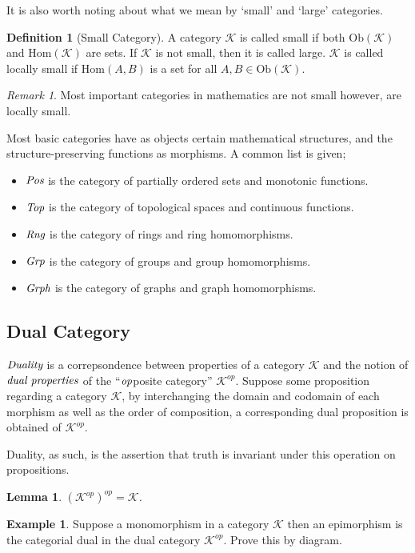 \documentclass[10pt, oneside, reqno]{amsart}
\theoremstyle{plain}%
\newtheorem{lem}[thm]{Lemma}
\theoremstyle{definition}
\newtheorem{defn}[thm]{Definition}
\newtheorem{exmp}[thm]{Example}
\theoremstyle{remark}
\newtheorem*{rem}{Remark}
\newcommand{\Cat}{\mathcal{K}}
\begin{document}
It is also worth noting about what we mean by `small' and `large' categories.

\begin{defn}[Small Category]
	A category $\Cat$ is called small if both $\text{Ob}(\Cat)$ and $\text{Hom}(\Cat)$ are sets.
	If $\Cat$ is not small, then it is called large.
	$\Cat$ is called locally small if $\text{Hom}(A,B)$ is a set for all $A, B \in \text{Ob}(\Cat)$.
\end{defn}

\begin{rem}
	Most important categories in mathematics are not small however, are locally small.
\end{rem}

Most basic categories have as objects certain mathematical structures, and the structure-preserving
functions as morphisms. A common list is given;
\begin{itemize}
\item $\emph{Pos}$ is the category of partially ordered sets and monotonic functions.
\item $\emph{Top}$ is the category of topological spaces and continuous functions.
\item $\emph{Rng}$ is the category of rings and ring homomorphisms.
\item $\emph{Grp}$ is the category of groups and group homomorphisms.
\item $\emph{Grph}$ is the category of graphs and graph homomorphisms.
\end{itemize}

\subsection{Dual Category} %
\label{subsec:dualcategory}
$\emph{Duality}$ is a correpsondence between properties of a category $\mathcal{K}$ and the notion
of $\emph{dual properties}$ of the ``$\emph{op}$posite category'' $\mathcal{K}^{op}$. Suppose some proposition
regarding a category $\mathcal{K}$, by interchanging the domain and codomain of each morphism as well as
the order of composition, a corresponding dual proposition is obtained of $\mathcal{K}^{op}$.

Duality, as such, is the assertion that truth is invariant under this operation on propositions.
\begin{lem}
 $(\mathcal{K}^{op})^{op} = \mathcal{K}$.
\end{lem}

\begin{exmp}
 Suppose a monomorphism in a category $\mathcal{K}$ then an epimorphism is the categorial dual
 in the dual category $\mathcal{K}^{op}$. Prove this by diagram.
\end{exmp}
\end{document}
